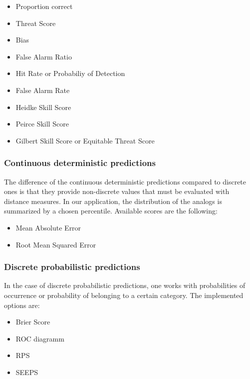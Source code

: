 \documentclass[review]{elsarticle}
\begin{document}
\begin{itemize}
	\setlength\itemsep{-1mm}
	\item Proportion correct \citep{Finley1884}
	\item Threat Score \citep{Gilbert1884}
	\item Bias
	\item False Alarm Ratio
	\item Hit Rate or Probabiliy of Detection
	\item False Alarm Rate
	\item Heidke Skill Score \citep{Heidke1926}
	\item Peirce Skill Score \citep{Peirce1884}
	\item Gilbert Skill Score or Equitable Threat Score \citep{Gilbert1884}
\end{itemize}


\subsubsection{Continuous deterministic predictions}

The difference of the continuous deterministic predictions compared to discrete ones is that they provide non-discrete values that must be evaluated with distance measures. In our application, the distribution of the analogs is summarized by a chosen percentile. Available scores are the following:

\begin{itemize}
	\setlength\itemsep{-1mm}
	\item Mean Absolute Error
	\item Root Mean Squared Error
\end{itemize}


\subsubsection{Discrete probabilistic predictions}

In the case of discrete probabilistic predictions, one works with probabilities of occurrence or probability of belonging to a certain category. The implemented options are:

\begin{itemize}
	\setlength\itemsep{-1mm}
	\item Brier Score \citep{Brier1950}
	\item ROC diagramm \citep[Relative Operating Characteristic or Receiver Operating Characteristic,][]{Mason1982}
	\item RPS \citep[Ranked Probability Score,][]{Epstein1969}
	\item SEEPS \citep[Stable Equitable Error in Probability Space,][]{Rodwell2010,Rodwell2011}
\end{itemize}
\end{document}
